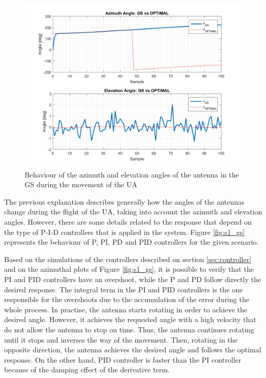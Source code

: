 \begin{figure}[H]
	\centering
	\includegraphics[scale=0.75]{figures/s1_pd_gs.png}
	\caption{Behaviour of the azimuth and elevation angles of the antenna in the GS during the movement of the UA}
	\label{fig:s1_pd_gs_alone}
\end{figure}

The previous explanation describes generally how the angles of the antennas change during the flight of the UA, taking into account the azimuth and elevation angles. However, there are some details related to the response that depend on the type of P-I-D controllers that is applied in the system. Figure \ref{fig:s1_gs} represents the behaviour of P, PI, PD and PID controllers for the given scenario.

Based on the simulations of the controllers described on section \ref{sec:controller} and on the azimuthal plots of Figure \ref{fig:s1_gs}, it is possible to verify that the PI and PID controllers have an overshoot, while the P and PD follow directly the desired response. The integral term in the PI and PID controllers is the one responsible for the overshoots due to the accumulation of the error during the whole process. In practise, the antenna starts rotating in order to achieve the desired angle. However, it achieves the requested angle with a high velocity that do not allow the antenna to stop on time. Thus, the antenna continues rotating until it stops and inverses the way of the movement. Then, rotating in the opposite direction, the antenna achieves the desired angle and follows the optimal response. On the other hand, PID controller is faster than the PI controller because of the damping effect of the derivative term.

